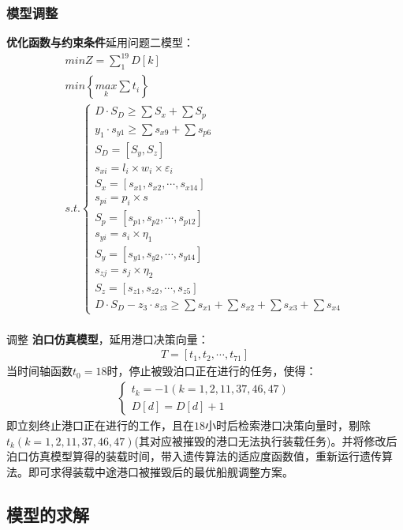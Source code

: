 \documentclass{whutmod}
\begin{document}
    \subsubsection{模型调整}
    \textbf{优化函数与约束条件}延用问题二模型：
     	\begin{gather}
min Z=\sum _{1}^{19}D[k]\\
min \left \{ \underset{k}{max}\sum t_{i} \right \}\\
s.t.\left\{\begin{matrix}	 D\cdot S_{D}\geq \sum  S_{x} + \sum  S_{p}
\\ y_{1}\cdot s_{y1}\geq \sum s_{x9}+ \sum  s_{p6}
\\S_{D}=[S_{y}, S_{z}]
\\ s_{xi}=l_{i}\times w_{i} \times \varepsilon _{i}
\\S_{x}=[s_{x1},s_{x2},\cdots,s_{x14}]
\\s_{pi}=p_{i}\times s
\\S_{p}=[s_{p1},s_{p2},\cdots,s_{p12}]
\\     s_{yi}=s_{i}\times \eta_{1}
\\   S_{y}=[s_{y1},s_{y2},\cdots,s_{y14}]
\\      s_{zj}=s_{j}\times \eta_{2}
\\ S_{z}=[s_{z1},s_{z2},\cdots,s_{z5}]
\\	D \cdot S_{D} - z_{3} \cdot s_{z3} \geq  \sum s_{x1}+ \sum s_{x2}+\sum s_{x3}+ \sum s_{x4}
\end{matrix}\right. 
\end{gather}
     ~\\
     调整 \textbf{泊口仿真模型}，延用港口决策向量：
     \begin{gather*}
     T=[t_{1},t_{2},\cdots,t_{71}]
     \end{gather*}
     当时间轴函数$t_{0}=18$时，停止被毁泊口正在进行的任务，使得：
     \begin{gather}
     \left\{\begin{matrix}
     t_{k}=-1(k=1,2,11,37,46,47)\\ 
     D[d]=D[d]+1
     \end{matrix}\right.
     \end{gather}
     即立刻终止港口正在进行的工作，且在$18$小时后检索港口决策向量时，剔除$t_{k}(k=1,2,11,37,46,47)$(其对应被摧毁的港口无法执行装载任务)。并将修改后泊口仿真模型算得的装载时间，带入遗传算法的适应度函数值，重新运行遗传算法。即可求得装载中途港口被摧毁后的最优船舰调整方案。
       \subsection{模型的求解}
\end{document}
